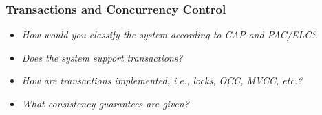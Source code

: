 
\begin{frame}
\frametitle{Transactions and Concurrency Control}
\begin{itemize}
\item \emph{How would you classify the system according to CAP and PAC/ELC?}
\item \emph{Does the system support transactions?}
\item \emph{How are transactions implemented, i.e., locks, OCC, MVCC, etc.?}
\item \emph{What consistency guarantees are given?}
\end{itemize}
\end{frame} 